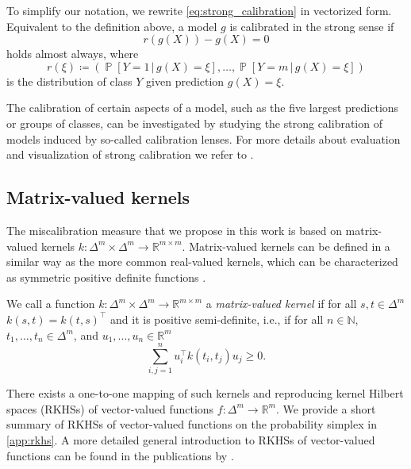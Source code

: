 \documentclass{article}
\DeclareMathOperator{\Prob}{\mathbb{P}}
\newcommand{\given}{\,|\,}
\begin{document}
To simplify our notation, we rewrite \cref{eq:strong_calibration} in vectorized
form. Equivalent to the definition above, a model $g$ is calibrated in the
strong sense if
\begin{equation}\label{eq:strong_calibration_vector}
  r(g(X)) - g(X) = 0
\end{equation}
holds almost always, where
\begin{equation*}
  r(\xi) \coloneqq (\Prob[Y = 1 \given g(X) = \xi], \ldots, \Prob[Y = m \given g(X) = \xi])
\end{equation*}
is the distribution of class $Y$ given prediction $g(X) = \xi$.

The calibration of certain aspects of a model, such as the five largest
predictions or groups of classes, can be investigated by studying the
strong calibration of models induced by so-called calibration lenses. For more
details about evaluation and visualization of strong calibration we refer to
\citet{vaicenavicius19_evaluat}.

\subsection{Matrix-valued kernels}

The miscalibration measure that we propose in this work is based on
matrix-valued kernels $k \colon \Delta^m \times \Delta^m \to \mathbb{R}^{m \times m}$.
Matrix-valued kernels can be defined in a similar way as the more common
real-valued kernels, which can be characterized as symmetric positive definite
functions \citep[Lemma~4]{berlinet04_reprod_kernel_hilber_spaces_probab_statis}.

\begin{definition}\label{def:kernel}
  We call a function $k \colon \Delta^m \times \Delta^m \to \mathbb{R}^{m \times m}$
  a \emph{matrix-valued kernel} if for all $s, t \in \Delta^m$
  $k(s,t) = k(t,s)^\intercal$ and it is positive semi-definite, i.e., if for all
  $n \in \mathbb{N}$, $t_1,\ldots,t_n \in \Delta^m$, and $u_1, \ldots, u_n \in \mathbb{R}^m$
  \begin{equation*}
    \sum_{i,j=1}^n u_i^\intercal k(t_i, t_j) u_j \geq 0.
  \end{equation*}
\end{definition}

There exists a one-to-one mapping of such kernels and reproducing kernel Hilbert
spaces (RKHSs) of vector-valued functions $f \colon \Delta^m \to \mathbb{R}^m$.
We provide a short summary of RKHSs of vector-valued functions on the probability
simplex in \cref{app:rkhs}. A more detailed general introduction to RKHSs of
vector-valued functions can be found in the publications by
\citet{micchelli05_learn_vector_valued_funct,carmeli10_vector_valued_reprod_kernel_hilber_spaces_univer,caponnetto08_univer_multi_task_kernel}.
\end{document}
